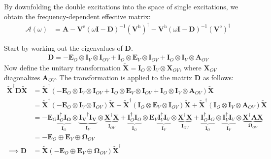 By downfolding the double excitations into the space of single excitations, we obtain the frequency-dependent effective matrix:
\begin{align}
\mathcal{A}(\omega)
&= \mathbf{A} - \mathbf{V}^{\mathrm{e}}(\omega \mathbf{I} - \mathbf{D})^{-1} (\mathbf{V}^{\mathrm{h}})^{\dagger} - \mathbf{V}^{\mathrm{h}}(\omega \mathbf{I} - \mathbf{D})^{-1} (\mathbf{V}^{\mathrm{e}})^{\dagger}
\end{align}

Start by working out the eigenvalues of $\bm{D}$.
\begin{align}
    \bm{D} = -\bm{E}_{O} \otimes \bm{I}_V \otimes \bm{I}_{OV} + \bm{I}_O \otimes \bm{E}_{V} \otimes \bm{I}_{OV} + \bm{I}_O \otimes \bm{I}_V \otimes \bm{A}_{OV}
\end{align}
Now define the unitary transformation $\bm{\tilde{X}}=\bm{I}_O \otimes \bm{I}_V \otimes \bm{X}_{OV}$, where $\bm{X}_{OV}$ diagonalizes $\bm{A}_{OV}$. The transformation is applied to the matrix $\bm{D}$ as follows:
\begin{align}
    \bm{\tilde{X}}^\dagger \bm{D} \bm{\tilde{X}} &= \bm{\tilde{X}}^\dagger \left(-\bm{E}_{O} \otimes \bm{I}_V \otimes \bm{I}_{OV} + \bm{I}_O \otimes \bm{E}_{V} \otimes \bm{I}_{OV} + \bm{I}_O \otimes \bm{I}_V \otimes \bm{A}_{OV} \right) \bm{\tilde{X}}  \\
&= \bm{\tilde{X}}^\dagger \left(-\bm{E}_{O} \otimes \bm{I}_V \otimes \bm{I}_{OV}\right) \bm{\tilde{X}} + \bm{\tilde{X}}^\dagger \left(\bm{I}_O \otimes \bm{E}_{V} \otimes \bm{I}_{OV}\right) \bm{\tilde{X}} + \bm{\tilde{X}}^\dagger \left(\bm{I}_O \otimes \bm{I}_V \otimes \bm{A}_{OV}\right) \bm{\tilde{X}}  \\
&= -\bm{E}_{O} \underbrace{\bm{I}_O^\dag \bm{I_O}}_{\bm{I}_O} \otimes \underbrace{\bm{I_V}^\dag \bm{I_V}}_{\bm{I}_V} \otimes \underbrace{\bm{X}^\dag \bm{X}}_{\bm{I}_{OV}} + \underbrace{\bm{I}_O^\dag \bm{I}_O}_{\bm{I}_O} \otimes \bm{E}_{V} \underbrace{\bm{I}_V^\dag \bm{I}_V}_{\bm{I}_{V}} \otimes \underbrace{\bm{X}^\dag \bm{X}}_{\bm{I}_{OV}} + \underbrace{\bm{I}_O^\dag \bm{I}_O}_{\bm{I}_O} \otimes \underbrace{\bm{I}_V^\dag \bm{I}_V}_{\bm{I}_V} \otimes \underbrace{\bm{X}^\dag \bm{A}\bm{X}}_{\bm{\Omega }_{OV}} \\
&= -\bm{E}_{O} \oplus \bm{E}_{V} \oplus \bm{\Omega }_{OV} \\
\implies \bm{D} &= \bm{\tilde{X}} \left(-\bm{E}_O \oplus \bm{E}_V \oplus \bm{\Omega }_{OV}\right) \bm{\tilde{X}}^\dagger\\
\end{align}
